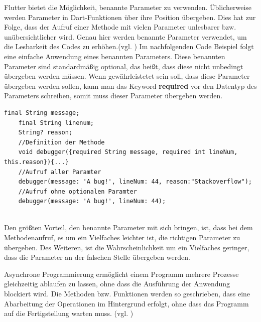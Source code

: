 Flutter bietet die Möglichkeit, benannte Parameter zu verwenden. Üblicherweise werden Parameter in Dart-Funktionen über ihre Position übergeben. Dies hat zur Folge, dass der Aufruf einer Methode mit vielen Parameter unlesbarer bzw. unübersichtlicher wird. Genau hier werden benannte Parameter verwendet, um die Lesbarkeit des Codes zu erhöhen.(vgl. \cite{Named-Parameter})
\vspace{0.5cm}
Im nachfolgenden Code Beispiel folgt eine einfache Anwendung eines benannten Parameters. Diese benannten Parameter sind standardmäßig optional, das heißt, dass diese nicht unbedingt übergeben werden müssen. Wenn gewährleistetet sein soll, dass diese Parameter übergeben werden sollen, kann man das Keyword \textbf{required} vor den Datentyp des Parameters schreiben, somit muss dieser Parameter übergeben werden. 

\begin{lstlisting}[caption=Beispiel Methode mit benannten Parameter,label={lst:namedparameter},style=flutterListingStyle]
    final String message;
    final String linenum;
    String? reason;
    //Definition der Methode
    void debugger({required String message, required int lineNum, this.reason}){...}
    //Aufruf aller Paramter
    debugger(message: 'A bug!', lineNum: 44, reason:"Stackoverflow");
    //Aufruf ohne optionalen Paramter
    debugger(message: 'A bug!', lineNum: 44);
    
\end{lstlisting}
Den größten Vorteil, den benannte Parameter mit sich bringen, ist, dass bei dem Methodenaufruf, es um ein Vielfaches leichter ist, die richtigen Parameter zu übergeben. Des Weiteren, ist die Wahrscheinlichkeit um ein Vielfaches geringer, dass die Parameter an der falschen Stelle übergeben werden. 

Asynchrone Programmierung ermöglicht einem Programm mehrere Prozesse gleichzeitig ablaufen zu lassen, ohne dass die Ausführung der Anwendung blockiert wird. Die Methoden bzw. Funktionen werden so geschrieben, dass eine Abarbeitung der Operationen im Hintergrund erfolgt, ohne dass das Programm auf die Fertigstellung warten muss. (vgl. \cite{asynchrone-programmierung})

